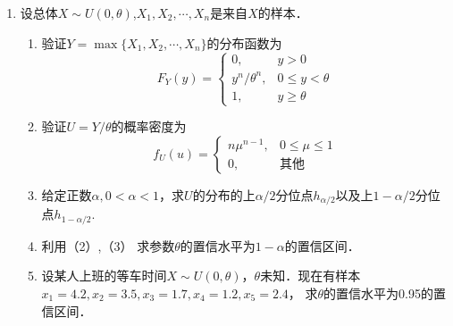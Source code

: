 \documentclass[10pt,a4paper]{article}
\begin{document}
\begin{enumerate}
    \item 设总体$X\sim U(0,\theta)$,$X_1,X_2,\cdots,X_n$是来自$X$的样本．
    \begin{enumerate}
        \item 验证$Y=\max\{X_1,X_2,\cdots,X_n\}$的分布函数为
        $$F_Y(y)=\left\{\begin{array}{ll}
            0, & y>0\\
            y^n/\theta^n, & 0\leq y <\theta\\
            1, &  y\geq \theta
        \end{array}\right.$$
        \item 验证$U=Y/\theta$的概率密度为
        $$f_U(u)=\left\{\begin{array}{ll}
            n\mu^{n-1}, & 0\leq \mu \leq 1\\
            0, & \mbox{其他}
        \end{array}\right.$$
        \item 给定正数$\alpha,0<\alpha<1$，求$U$的分布的上$\alpha/2$分位点$h_{\alpha/2}$以及上$1-\alpha/2$分位点$h_{1-\alpha/2}$.
        \item 利用（2）,（3） 求参数$\theta$的置信水平为$1-\alpha$的置信区间．
        \item 设某人上班的等车时间$X\sim U(0,\theta)$，$\theta$未知．现在有样本$x_1=4.2,x_2=3.5,x_3=1.7,x_4=1.2,x_5=2.4$，
        求$\theta$的置信水平为0.95的置信区间．
    \end{enumerate}

    












  

\end{enumerate}
\end{document}
